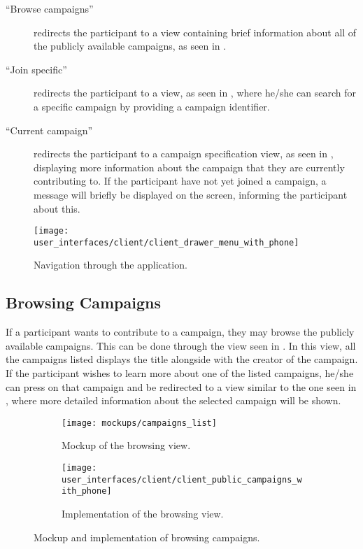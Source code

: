 \begin{description}
    \item[``Browse campaigns''] redirects the participant to a view containing brief information about all of the publicly available campaigns, as seen in .

    \item[``Join specific''] redirects the participant to a view, as seen in , where he/she can search for a specific campaign by providing a campaign identifier.

    \item[``Current campaign''] redirects the participant to a campaign specification view, as seen in , displaying more information about the campaign that they are currently contributing to. If the participant have not yet joined a campaign, a message will briefly be displayed on the screen, informing the participant about this.
\end{description}

\begin{figure}[!htbp]
    \centering
    \texttt{[image: user\_interfaces/client/client\_drawer\_menu\_with\_phone]}
    \caption{Navigation through the application.}
    \label{fig:navigation}
\end{figure}
\FloatBarrier

\subsection{Browsing Campaigns}
\label{sub:browsing_campaigns}

If a participant wants to contribute to a campaign, they may browse the publicly available campaigns. This can be done through the view seen in . In this view, all the campaigns listed displays the title alongside with the creator of the campaign. If the participant wishes to learn more about one of the listed campaigns, he/she can press on that campaign and be redirected to a view similar to the one seen in , where more detailed information about the selected campaign will be shown. 

\begin{figure}[!htbp]
    \begin{subfigure}[!t]{.48\textwidth}
        \centering
        \texttt{[image: mockups/campaigns\_list]}
        \caption{Mockup of the browsing view.}
        \label{fig:mockup_public_campaigns}
    \end{subfigure}%
    \begin{subfigure}[!t]{.52\textwidth}
        \centering
        \texttt{[image: user\_interfaces/client/client\_public\_campaigns\_with\_phone]}
        \caption{Implementation of the browsing view.}
        \label{fig:implementation_public_campaigns}
    \end{subfigure}
    \caption{Mockup and implementation of browsing campaigns.}
    \label{fig:public_campaigns}
\end{figure}
\FloatBarrier

